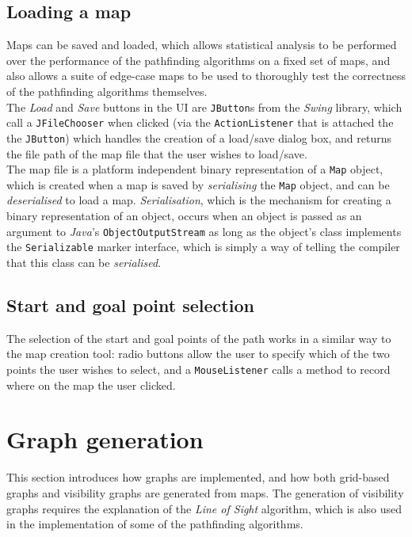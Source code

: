 \documentclass[12pt,notitlepage]{report}
\begin{document}
\subsection{Loading a map}
Maps can be saved and loaded, which allows statistical analysis to be performed over the performance of the pathfinding algorithms on a fixed set of maps, and also allows a suite of edge-case maps to be used to thoroughly test the correctness of the pathfinding algorithms themselves.\\

\noindent
The {\em Load} and {\em Save} buttons in the UI are {\tt JButton}s from the {\em Swing} library, which call a {\tt JFileChooser} when clicked (via the {\tt ActionListener} that is attached the the {\tt JButton}) which handles the creation of a load/save dialog box, and returns the file path of the map file that the user wishes to load/save.\\

\noindent
The map file is a platform independent binary representation of a {\tt Map} object, which is created when a map is saved by {\em serialising} the {\tt Map} object, and can be {\em deserialised} to load a map. {\em Serialisation}, which is the mechanism for creating a binary representation of an object, occurs when an object is passed as an argument to {\em Java}'s {\tt ObjectOutputStream} as long as the object's class implements the {\tt Serializable} marker interface, which is simply a way of telling the compiler that this class can be {\em serialised}.

\subsection{Start and goal point selection}
The selection of the start and goal points of the path works in a similar way to the map creation tool: radio buttons allow the user to specify which of the two points the user wishes to select, and a {\tt MouseListener} calls a method to record where on the map the user clicked.

\section{Graph generation}

This section introduces how graphs are implemented, and how both grid-based graphs and visibility graphs are generated from maps. The generation of visibility graphs requires the explanation of the {\em Line of Sight} algorithm, which is also used in the implementation of some of the pathfinding algorithms.\\
\end{document}
